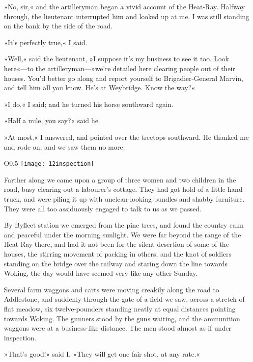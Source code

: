 »No, sir,« and the artilleryman began a vivid account of the Heat-Ray. Halfway through, the lieutenant interrupted him and looked up at me. I was still standing on the bank by the side of the road.

»It's perfectly true,« I said.

»Well,« said the lieutenant, »I suppose it's my business to see it too. Look here«—to the artilleryman—»we're detailed here clearing people out of their houses. You'd better go along and report yourself to Brigadier-General Marvin, and tell him all you know. He's at Weybridge. Know the way?«

»I do,« I said; and he turned his horse southward again.

»Half a mile, you say?« said he.

»At most,« I answered, and pointed over the treetops southward. He thanked me and rode on, and we saw them no more.

\makeatletter
{}
{%
\begin{wrapfigure}{O}{0.5\textwidth}
\centering
\texttt{[image: 12inspection]}
\end{wrapfigure}
}{%

}
\makeatother

Farther along we came upon a group of three women and two children in the road, busy clearing out a labourer's cottage. They had got hold of a little hand truck, and were piling it up with unclean-looking bundles and shabby furniture. They were all too assiduously engaged to talk to us as we passed.

By Byfleet station we emerged from the pine trees, and found the country calm and peaceful under the morning sunlight. We were far beyond the range of the Heat-Ray there, and had it not been for the silent desertion of some of the houses, the stirring movement of packing in others, and the knot of soldiers standing on the bridge over the railway and staring down the line towards Woking, the day would have seemed very like any other Sunday.

Several farm waggons and carts were moving creakily along the road to Addlestone, and suddenly through the gate of a field we saw, across a stretch of flat meadow, six twelve-pounders standing neatly at equal distances pointing towards Woking. The gunners stood by the guns waiting, and the ammunition waggons were at a business-like distance. The men stood almost as if under inspection.

»That's good!« said I. »They will get one fair shot, at any rate.«

